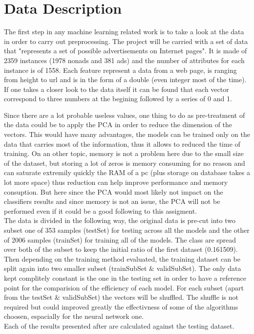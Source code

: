\section{Data Description}

The first step in any machine learning related work is to take a look at the data in order to carry out preprocessing.
The project will be carried with a set of data that "represents a set of possible advertisements on Internet pages". It is made of 2359 instances (1978 nonads and 381 ads) and the number of attributes for each instance is of 1558. Each feature represent a data from a web page, is ranging from height to url and is in the form of a double (even integer most of the time).\\

If one takes a closer look to the data itself it can be found that each vector correspond to three numbers at the begining followed by a series of 0 and 1.

Since there are a lot probable useless values, one thing to do as pre-treatment of the data could be to apply the PCA in order to reduce the dimension of the vectors. This would have many advantages, the models can be trained only on the data that carries most of the information, thus it allows to reduced the time of training. On an other topic, memory is not a problem here due to the small size of the dataset, but storing a lot of zeros is memory consuming for no reason and can saturate extremily quickly the RAM of a pc (plus storage on database takes a lot more space) thus reduction can help improve performance and memory consuption. But here since the PCA would most likely not impact on the classifiers results and since memory is not an issue, the PCA will not be performed even if it could be a good following to this assigment.\\

The data is divided in the following way, the original data is pre-cut into two subset one of 353 samples (testSet) for testing across all the models and the other of 2006 samples (trainSet) for training all of the models. The class are spread over both of the subset to keep the initial ratio of the first dataset (0.161509). Then depending on the training method evaluated, the training dataset can be split again into two smaller subset (trainSubSet \& validSubSet). The only data kept complitely constant is the one in the testing set in order to have a reference point for the comparision of the efficiency of each model.
For each subset (apart from the testSet \& validSubSet) the vectors will be shuffled. The shuffle is not required but could improved greatly the effectivness of some of the algorithms choosen, espacially for the neural network one.\\

Each of the results presented after are calculated against the testing dataset.

